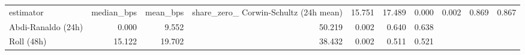 \begin{tabular}{lrrrrrr}
\toprule
estimator & median_bps & mean_bps & share_zero_%
\midrule
Corwin-Schultz (24h mean) & 15.751 & 17.489 & 0.000 & 0.002 & 0.869 & 0.867 \\
Abdi-Ranaldo (24h) & 0.000 & 9.552 & 50.219 & 0.002 & 0.640 & 0.638 \\
Roll (48h) & 15.122 & 19.702 & 38.432 & 0.002 & 0.511 & 0.521 \\
\bottomrule
\end{tabular}
